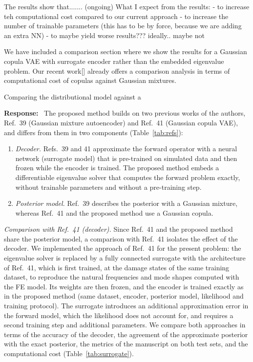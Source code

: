 \documentclass[11pt]{article}
\newenvironment{response}{\par\smallskip\noindent\color{resp}\textbf{Response:}\ }{\par}
\begin{document}
The results show that....... (ongoing)
What I expect from the results:
- to increase teh computational cost compared to our current approach 
- to increase the number of trainable parameters (this has to be by force, because we are adding an extra NN) 
- to maybe yield worse results??? ideally.. maybe not


We have included a comparison section where we show the results for a Gaussian copula VAE with surrogate encoder rather than the embedded eigenvalue problem. 
Our recent work[] already offers a comparison analysis in terms of computational cost of copulas against Gaussian mixtures.

Comparing the distributional model against a 




\begin{response}
The proposed method builds on two previous works of the authors, Ref.~39 (Gaussian mixture autoencoder) and Ref.~41
(Gaussian copula VAE), and differs from them in two components (Table~\ref{tab:refs}):
\begin{enumerate}[leftmargin=*,label=(\roman*)]
\item \emph{Decoder.} Refs.~39 and 41 approximate the forward operator with a neural network (surrogate model) that is
pre-trained on simulated data and then frozen while the encoder is trained. The proposed method embeds a differentiable
eigenvalue solver that computes the forward problem exactly, without trainable parameters and without a pre-training
step.
\item \emph{Posterior model.} Ref.~39 describes the posterior with a Gaussian mixture, whereas Ref.~41 and the proposed
method use a Gaussian copula.
\end{enumerate}

\textit{Comparison with Ref.~41 (decoder).} Since Ref.~41 and the proposed method share the posterior model, a comparison
with Ref.~41 isolates the effect of the decoder. We implemented the approach of Ref.~41 for the present problem: the
eigenvalue solver is replaced by a fully connected surrogate with the architecture of Ref.~41, which is first trained, at
the damage states of the same training dataset, to reproduce the natural frequencies and mode shapes computed with the FE
model. Its weights are then frozen,
and the encoder is trained exactly as in the proposed method (same dataset, encoder, posterior model, likelihood and
training protocol). The surrogate introduces an additional approximation error in the forward model, which the likelihood
does not account for, and requires a second training step and additional parameters. We compare both approaches in terms of
the accuracy of the decoder, the agreement of the approximate posterior with the exact posterior, the metrics of the
manuscript on both test sets, and the computational cost (Table~\ref{tab:surrogate}).


\end{response}
\end{document}

